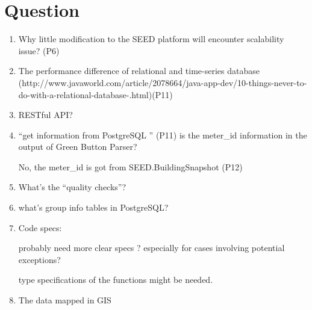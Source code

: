 \documentclass[hidelinks,12pt]{article}
\begin{document}
\section{Question}
\begin{enumerate}
\item Why little modification to the SEED platform will encounter
  scalability issue? (P6)
  
\item The performance difference of relational and time-series
  database (http://www.javaworld.com/article/2078664/java-app-dev/10-things-never-to-do-with-a-relational-database-.html)(P11)
  
\item RESTful API?
\item ``get information from PostgreSQL '' (P11)
  is the meter\_id information in the output of Green Button Parser?
  
No, the meter\_id is got from SEED.BuildingSnapshot (P12)
  
\item What's the ``quality checks''?
\item what's group info tables in PostgreSQL?
\item Code specs: 

probably need more clear specs ? especially for cases involving potential exceptions?

type specifications of the functions might be needed.
\item The data mapped in GIS

\end{enumerate}
\end{document}
